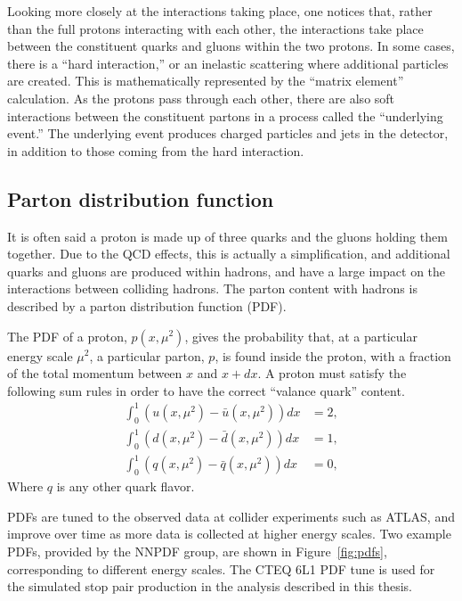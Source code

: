 Looking more closely at the interactions taking place, one notices that,
rather than the full protons interacting with each other, the interactions
take place between the constituent quarks and gluons within the two protons.
In some cases, there is a ``hard interaction,'' or an inelastic scattering
where additional particles are created.
This is mathematically represented by the ``matrix element'' calculation.
As the protons pass through each other, there are also soft interactions
between the constituent partons in a process called the ``underlying event.''
The underlying event produces charged particles and jets in the detector, in
addition to those coming from the hard interaction.

\FloatBarrier
\subsection{Parton distribution function}
\label{sec:pdf}

It is often said a proton is made up of three quarks and the gluons holding
them together.
Due to the QCD effects, this is actually a simplification, and additional
quarks and gluons are produced within hadrons, and have a large impact 
on the interactions between colliding hadrons.
The parton content with hadrons is described by a parton distribution
function (PDF).

The PDF of a proton, $p(x, \mu^2)$, gives the probability that, at a particular
energy scale $\mu^2$, a particular parton, $p$, is found inside the proton, with
a fraction of the total momentum between $x$ and $x+dx$.
A proton must satisfy the following sum rules in order to have the correct
``valance quark'' content.
\begin{align}
  \int_0^1 \left( u(x, \mu^2) - \bar{u}(x, \mu^2) \right) dx & = 2, \\
  \int_0^1 \left( d(x, \mu^2) - \bar{d}(x, \mu^2) \right) dx & = 1, \\
  \int_0^1 \left( q(x, \mu^2) - \bar{q}(x, \mu^2) \right) dx & = 0,
\end{align}
Where $q$ is any other quark flavor.

PDFs are tuned to the observed data at collider experiments such as ATLAS,
and improve over time as more data is collected at higher energy scales.
Two example PDFs, provided by the NNPDF group, are shown in
Figure~\ref{fig:pdfs}, corresponding to different energy scales.
The CTEQ 6L1 PDF tune is used for the simulated stop pair production in the
analysis described in this thesis.


